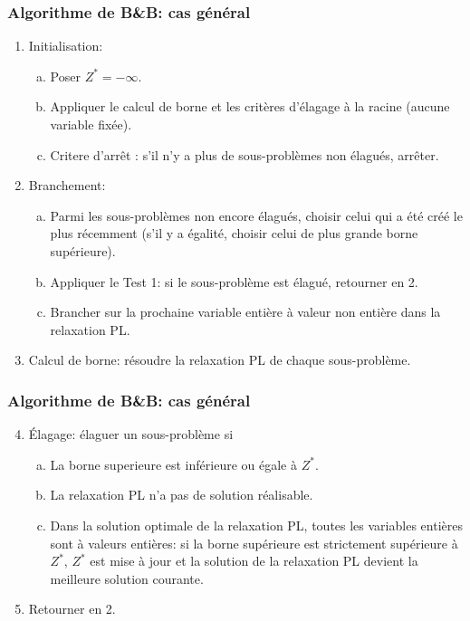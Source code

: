 \documentclass[usepdftitle=false]{beamer}
\begin{document}
\begin{frame}
\frametitle{Algorithme de B\&B: cas général}

\begin{enumerate}
\item
Initialisation:
\begin{enumerate}[(a)]
\item
Poser $Z^* = -\infty$.
\item
Appliquer le calcul de borne et les critères d'élagage à la racine (aucune variable fixée).
\item
Critere d'arrêt : s'il n'y a plus de sous-problèmes non élagués, arrêter.
\end{enumerate}
\item
Branchement:
\begin{enumerate}[(a)]
\item
Parmi les sous-problèmes non encore élagués, choisir celui qui a été créé le plus récemment (s'il y a égalité, choisir celui de plus grande borne supérieure).
\item
Appliquer le Test 1: si le sous-problème est élagué, retourner en 2.
\item
Brancher sur la prochaine variable entière à valeur non entière dans la relaxation PL.
\end{enumerate}
\item
Calcul de borne: résoudre la relaxation PL de chaque sous-problème.
\end{enumerate}

\end{frame}

\begin{frame}
\frametitle{Algorithme de B\&B: cas général}

\begin{enumerate}
\setcounter{enumi}{3}
\item
Élagage: élaguer un sous-problème si
\begin{enumerate}[(a)]
\item
La borne superieure est inférieure ou égale à $Z^*$.
\item
La relaxation PL n'a pas de solution réalisable.
\item
Dans la solution optimale de la relaxation PL, toutes les variables entières sont à valeurs entières: si la borne
supérieure est strictement supérieure à $Z^*$, $Z^*$ est mise à jour et la solution de la relaxation PL devient la meilleure solution courante.
\end{enumerate}
\item
Retourner en 2.
\end{enumerate}

\end{frame}
\end{document}
